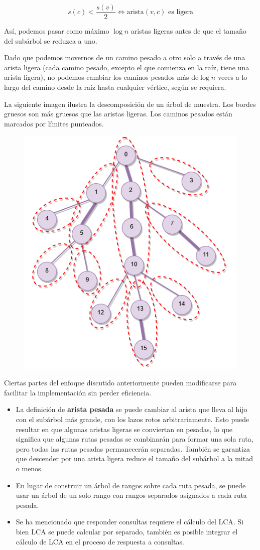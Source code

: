 $$s(c) < \frac{s(v)}{2} \iff \text{arista}(v,c)\text{ es ligera}$$

Así, podemos pasar como máximo $\log n$ aristas ligeras antes de que el tamaño del subárbol se reduzca a uno.

Dado que podemos movernos de un camino pesado a otro solo a través de una arista ligera (cada camino pesado, excepto el que comienza en la raíz, tiene una arista ligera), no podemos cambiar los caminos pesados más de$\log n$ veces a lo largo del camino desde la raíz hasta cualquier vértice, según se requiera.

La siguiente imagen ilustra la descomposición de un árbol de muestra. Los bordes gruesos son más gruesos que las aristas ligeras. Los caminos pesados están marcados por límites punteados.

\begin{figure}[h!]
	\centering
	\includegraphics[width=0.5\linewidth]{img/hld}
	\label{fig:hld}
\end{figure}

Ciertas partes del enfoque discutido anteriormente pueden modificarse para facilitar la implementación sin perder eficiencia.

\begin{itemize}
	\item La definición de \textbf{arista pesada} se puede cambiar al arista que lleva al hijo con el subárbol más grande, con los lazos rotos arbitrariamente. Esto puede resultar en que algunas aristas ligeras se conviertan en pesadas, lo que significa que algunas rutas pesadas se combinarán para formar una sola ruta, pero todas las rutas pesadas permanecerán separadas. También se garantiza que descender por una arista ligera reduce el tamaño del subárbol a la mitad o menos.
	\item En lugar de construir un árbol de rangos sobre cada ruta pesada, se puede usar un árbol de un solo rango con rangos separados asignados a cada ruta pesada.
	\item Se ha mencionado que responder consultas requiere el cálculo del LCA. Si bien LCA se puede calcular por separado, también es posible integrar el cálculo de LCA en el proceso de respuesta a consultas.
\end{itemize}